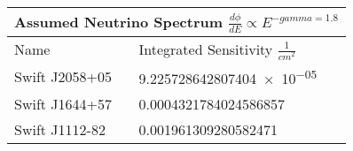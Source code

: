 \documentclass[]{article}
\begin{document}
\begin{tabular}{ |p{3.5cm}||p{4.5cm}|} 
\hline 
\multicolumn{2}{|c|}{Assumed Neutrino Spectrum $ \frac {d \phi}{dE} \propto E ^ {-gamma=1.8} $} \\ 
\hline 
Name&Integrated Sensitivity $\frac{1}{cm^{2}} $ \\ 
\hline 
Swift J2058+05 & \num[round-precision=2, round-mode=figures, scientific-notation=true]{9.225728642807404e-05}  \\ 
Swift J1644+57 & \num[round-precision=2, round-mode=figures, scientific-notation=true]{0.0004321784024586857}  \\ 
Swift J1112-82 & \num[round-precision=2, round-mode=figures, scientific-notation=true]{0.001961309280582471}  \\ 
\hline 
\end{tabular} 
\end{document}
